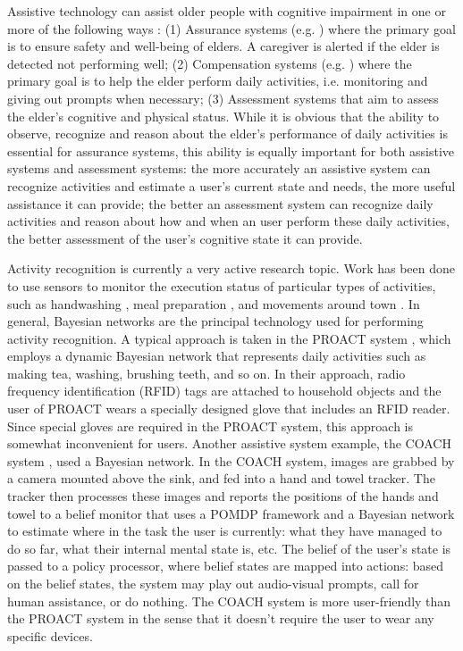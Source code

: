 Assistive technology can assist older people with cognitive impairment in one or more of the following ways \cite{pollack2005intelligent}: (1) Assurance systems (e.g. \cite{hoey2012lacasa}) where the primary goal is to ensure safety and well-being of elders. A caregiver is alerted if the elder is detected not performing well; (2) Compensation systems (e.g. \cite{boger2005decision, peters2014automatic, hoey2010automated}) where the primary goal is to help the elder perform daily activities, i.e. monitoring and giving out prompts when necessary; (3) Assessment systems that aim to assess the elder's cognitive and physical status. While it is obvious that the ability to observe, recognize and reason about the elder's performance of daily activities is essential for assurance systems, this ability is equally important for both assistive systems and assessment systems: the more accurately an assistive system can recognize activities and estimate a user's current state and needs, the more useful assistance it can provide; the better an assessment system can recognize daily activities and reason about how and when an user perform these daily activities, the better assessment of the user's cognitive state it can provide.

Activity recognition is currently a very active research topic. Work has been done to use sensors to monitor the execution status of particular types of activities, such as handwashing \cite{hoey2010automated}, meal preparation \cite{philipose2004inferring}, and movements around town \cite{hoey2012lacasa}. In general, Bayesian networks are the principal technology used for performing activity recognition. A typical approach is taken in the PROACT system \cite{philipose2004inferring}, which employs a dynamic Bayesian network that represents daily activities such as making tea, washing, brushing teeth, and so on. In their approach, radio frequency identification (RFID) tags are attached to household objects and the user of PROACT wears a specially designed glove that includes an RFID reader. Since special gloves are required in the PROACT system, this approach is somewhat inconvenient for users. Another assistive system example, the COACH system \cite{boger2005decision, hoey2010automated}, used a Bayesian network. In the COACH system, images are grabbed by a camera mounted above the sink, and fed into a hand and towel tracker. The tracker then processes these images and reports the positions of the hands and towel to a belief monitor that uses a POMDP framework and a Bayesian network to estimate where in the task the user is currently: what they have managed to do so far, what their internal mental state is, etc. The belief of the user's state is passed to a policy processor, where belief states are mapped into actions: based on the belief states, the system may play out audio-visual prompts, call for human assistance, or do nothing. The COACH system is more user-friendly than the PROACT system in the sense that it doesn't require the user to wear any specific devices.

